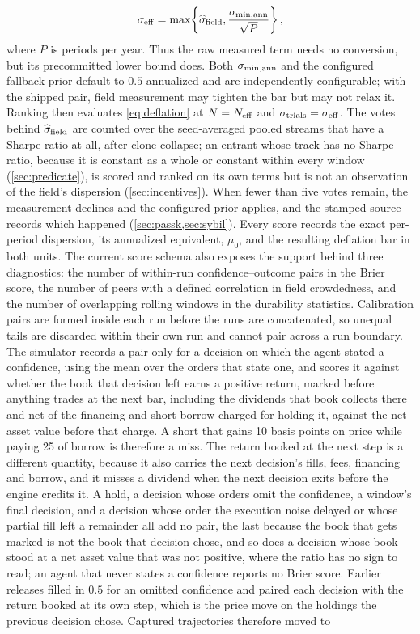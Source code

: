 \begin{equation}\label{eq:dispersion-floor}
\sigma_{\rm eff}=\max\!\left\{\widehat\sigma_{\rm field},\frac{\sigma_{\min,\rm ann}}{\sqrt{P}}\right\},
\end{equation}
where $P$ is periods per year. Thus the raw measured term needs no conversion, but its precommitted lower bound does. Both $\sigma_{\min,\rm ann}$ and the configured fallback prior default to $0.5$ annualized and are independently configurable; with the shipped pair, field measurement may tighten the bar but may not relax it. Ranking then evaluates \cref{eq:deflation} at $N = N_{\rm eff}$ and $\sigma_{\text{trials}} = \sigma_{\rm eff}$. The votes behind $\widehat\sigma_{\rm field}$ are counted over the seed-averaged pooled streams that have a Sharpe ratio at all, after clone collapse; an entrant whose track has no Sharpe ratio, because it is constant as a whole or constant within every window (\cref{sec:predicate}), is scored and ranked on its own terms but is not an observation of the field's dispersion (\cref{sec:incentives}). When fewer than five votes remain, the measurement declines and the configured prior applies, and the stamped source records which happened (\cref{sec:passk,sec:sybil}). Every score records the exact per-period dispersion, its annualized equivalent, $\mu_0$, and the resulting deflation bar in both units. The current score schema also exposes the support behind three diagnostics: the number of within-run confidence--outcome pairs in the Brier score, the number of peers with a defined correlation in field crowdedness, and the number of overlapping rolling windows in the durability statistics. Calibration pairs are formed inside each run before the runs are concatenated, so unequal tails are discarded within their own run and cannot pair across a run boundary. The simulator records a pair only for a decision on which the agent stated a confidence, using the mean over the orders that state one, and scores it against whether the book that decision left earns a positive return, marked before anything trades at the next bar, including the dividends that book collects there and net of the financing and short borrow charged for holding it, against the net asset value before that charge. A short that gains 10 basis points on price while paying 25 of borrow is therefore a miss. The return booked at the next step is a different quantity, because it also carries the next decision's fills, fees, financing and borrow, and it misses a dividend when the next decision exits before the engine credits it. A hold, a decision whose orders omit the confidence, a window's final decision, and a decision whose order the execution noise delayed or whose partial fill left a remainder all add no pair, the last because the book that gets marked is not the book that decision chose, and so does a decision whose book stood at a net asset value that was not positive, where the ratio has no sign to read; an agent that never states a confidence reports no Brier score. Earlier releases filled in $0.5$ for an omitted confidence and paired each decision with the return booked at its own step, which is the price move on the holdings the previous decision chose. Captured trajectories therefore moved to 